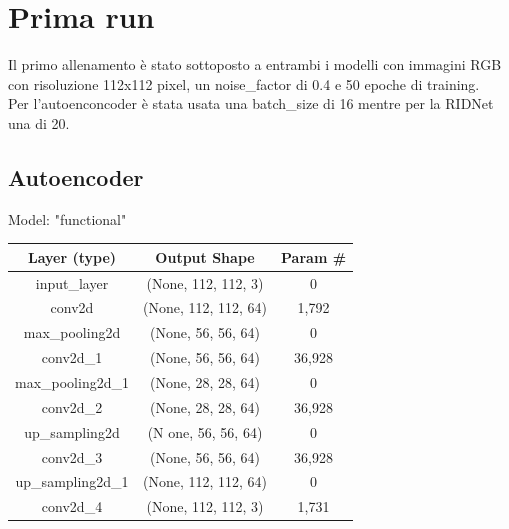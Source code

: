 \documentclass[12pt,a4paper,openright,twoside]{book}
\begin{document}
\section{Prima run}
Il primo allenamento è stato sottoposto a entrambi i modelli con immagini RGB con risoluzione 112x112 pixel, un noise\_factor di 0.4 e 50 epoche di training.\\
Per l'autoenconcoder è stata usata una batch\_size di 16 mentre per la RIDNet una di 20.\\
\subsection{Autoencoder}
Model: "functional"\\
\begin{tabular}{|| c | c | c ||}
  \hline
  Layer (type) & Output Shape & Param \# \\
  \hline
  input\_layer & (None, 112, 112, 3) & 0 \\
  \hline
  conv2d & (None, 112, 112, 64) & 1,792 \\
  \hline
  max\_pooling2d & (None, 56, 56, 64) & 0 \\
  \hline
  conv2d\_1 & (None, 56, 56, 64) & 36,928 \\
  \hline
  max\_pooling2d\_1 & (None, 28, 28, 64) & 0 \\
  \hline
  conv2d\_2 & (None, 28, 28, 64) & 36,928 \\
  \hline
  up\_sampling2d & (N one, 56, 56, 64) & 0 \\
  \hline
  conv2d\_3 & (None, 56, 56, 64) & 36,928 \\
  \hline
  up\_sampling2d\_1 & (None, 112, 112, 64) & 0 \\
  \hline
  conv2d\_4 & (None, 112, 112, 3) & 1,731 \\
  \hline  
\end{tabular}
\end{document}
